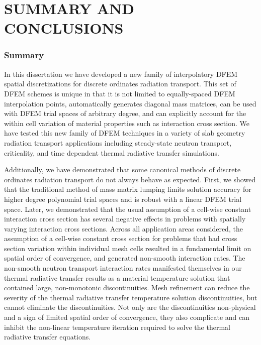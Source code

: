 %
%
%



\chapter{\uppercase{Summary and Conclusions}}
\label{sec:chapter7_conclusions}

\subsection{Summary}

In this dissertation we have developed a new family of interpolatory DFEM spatial discretizations for discrete ordinates radiation transport.
This set of DFEM schemes is unique in that it is not limited to equally-spaced DFEM interpolation points, automatically generates diagonal mass matrices, can be used with DFEM trial spaces of arbitrary degree, and can explicitly account for the within cell variation of material properties such as interaction cross section.
We have tested this new family of DFEM techniques in a variety of slab geometry radiation transport applications including steady-state neutron transport, criticality, and time dependent thermal radiative transfer simulations.

Additionally, we have demonstrated that some canonical methods of discrete ordinates radiation transport do not always behave as expected.
First, we showed that the traditional method of mass matrix lumping limits solution accuracy for higher degree polynomial trial spaces and is robust with a linear DFEM trial space.
Later, we demonstrated that the usual assumption of a cell-wise constant interaction cross section has several negative effects in problems with spatially varying interaction cross sections.
Across all application areas considered, the assumption of a cell-wise constant cross section for problems that had cross section variation within individual mesh cells resulted in a fundamental limit on spatial order of convergence, and generated non-smooth interaction rates.
The non-smooth neutron transport interaction rates manifested themselves in our thermal radiative transfer results as a material temperature solution that contained large, non-monotonic discontinuities.
Mesh refinement can reduce the severity of the thermal radiative transfer temperature solution discontinuities, but cannot eliminate the discontinuities.
Not only are the discontinuities non-physical and a sign of limited spatial order of convergence, they also complicate and can inhibit the non-linear temperature iteration required to solve the thermal radiative transfer equations. 

